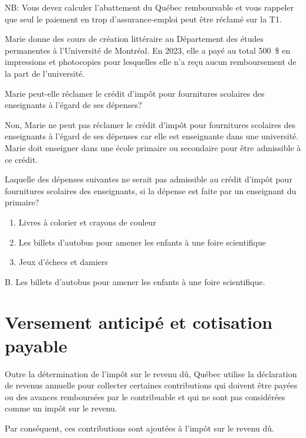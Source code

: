 NB: Vous devez calculer l'abattement du Québec remboursable et vous rappeler que seul le paiement en trop d'assurance-emploi peut être réclamé sur la T1.

\begin{question}
	Marie donne des cours de création littéraire au Département des études permanentes à l'Université de Montréal. En 2023, elle a payé au total 500~\$ en impressions et photocopies pour lesquelles elle n'a reçu aucun remboursement de la part de l'université.
	
	Marie peut-elle réclamer le crédit d'impôt pour fournitures scolaires des enseignants à l'égard de ses dépenses?
\end{question}
Non, Marie ne peut pas réclamer le crédit d'impôt pour fournitures scolaires des enseignants à l'égard de ses dépenses car elle est enseignante dans une université. Marie doit enseigner dans une école primaire ou secondaire pour être admissible à ce crédit.

\begin{question}
	Laquelle des dépenses suivantes ne serait pas admissible au crédit d'impôt pour fournitures scolaires des enseignants, si la dépense est faite par un enseignant du primaire?
	\begin{enumerate}[label=\Alph*.]
		\item Livres à colorier et crayons de couleur
		\item Les billets d'autobus pour amener les enfants à une foire scientifique
		\item Jeux d'échecs et damiers
	\end{enumerate}
\end{question}
B. Les billets d'autobus pour amener les enfants à une foire scientifique.



\section{Versement anticipé et cotisation payable}
\begin{intro}
	Outre la détermination de l'impôt sur le revenu dû, Québec utilise la déclaration de revenus annuelle pour collecter certaines \og contributions \fg{} qui doivent être payées ou des \og avances\fg{} remboursées par le contribuable et qui ne sont pas considérées comme un impôt sur le revenu.
	
	Par conséquent, ces contributions sont ajoutées à l'impôt sur le revenu dû.
\end{intro}


